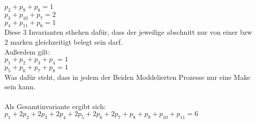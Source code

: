 $p_2+p_9+p_8=1$\\
$p_3+p_{10}+p_7=2$\\
$p_4+p_{11}+p_6=1$\\
Diese 3 Invarianten sthehen dafür, dass der jeweilige abschnitt nur von einer bzw 2 marken gleichzeitigt belegt sein darf.\\
Außerdem gilt:\\
$p_1+p_2+p_3+p_4=1$\\
$p_5+p_6+p_7+p_8=1$\\
Was dafür steht, dass in jedem der Beiden Moddelierten Prozesse nur eine Make sein kann.\\
\\
Als Gesamtinvariante ergibt sich:\\
$p_1+2p_2+2p_3+2p_4+2p_5+2p_6+2p_7+p_8+p_9+p_{10}+p_{11}=6$\\

